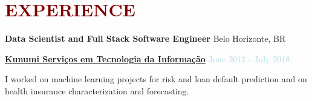 

\section*{\textcolor{maroon}{\normalsize EXPERIENCE}}







\textbf{Data Scientist and Full Stack Software Engineer} \hfill {Belo Horizonte, BR}
\begin{outerlist}

\item[] \href{https://kunumi.com}{\textbf{Kunumi Serviços em Tecnologia da Informação}}  \hfill {\textcolor{lightblue}{June 2017 - July 2018}} \medskip 

        \begin{innerlist}[-]
        \item I worked on machine learning projects for risk and loan default prediction and on health insurance characterization and forecasting.  
        \end{innerlist}

\end{outerlist}

\medskip



